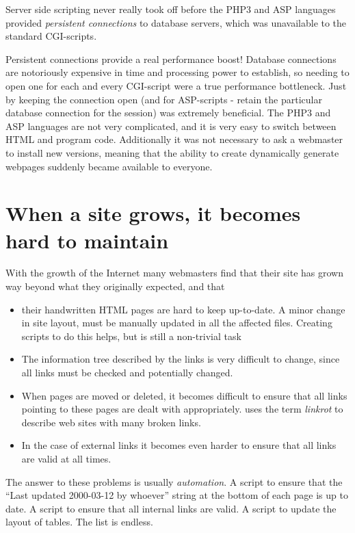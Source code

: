 Server side scripting never really took off before the PHP3 and ASP
languages provided \textit{persistent connections} to database
servers, which was unavailable to the standard CGI-scripts.

Persistent connections provide a real performance boost!  Database
connections are notoriously expensive in time and processing power to
establish, so needing to open one for each and every CGI-script were a
true performance bottleneck.  Just by keeping the connection open (and
for ASP-scripts - retain the particular database connection for the
session) was extremely beneficial.  The PHP3 and ASP languages are not
very complicated, and it is very easy to switch between HTML and
program code.  Additionally it was not necessary to ask a webmaster to
install new versions, meaning that the ability to create dynamically
generate webpages suddenly became available to everyone.


\section{When a site grows, it becomes hard to maintain}
\label{sec:when-a-site-grows-it-becomes-hard-to-maintain}

With the growth of the Internet many webmasters find that their site
has grown way beyond what they originally expected, and that

\begin{itemize}
\item their handwritten HTML pages are hard to keep up-to-date.  A
  minor change in site layout, must be manually updated in all the
  affected files.  Creating scripts to do this helps, but is still a
  non-trivial task
\item The information tree described by the links is very difficult to
  change, since all links must be checked and potentially changed.
\item When pages are moved or deleted, it becomes difficult to ensure
  that all links pointing to these pages are dealt with appropriately.
  uses the term \textit{linkrot} to describe web sites with many
  broken links.
\item In the case of external links it becomes even harder to ensure
  that all links are valid at all times.
\end{itemize}

The answer to these problems is usually \textit{automation}.  A script
to ensure that the  ``Last updated 2000-03-12 by whoever'' string at
the bottom of each page is up to date.   A script to ensure that all
internal links are valid.  A script to update the layout of tables.
The list is endless.


